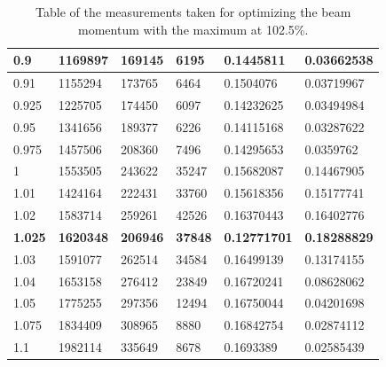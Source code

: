 \documentclass[11pt,a4paper]{article}
\begin{document}
\begin{table}[]
\begin{tabular}{|l|l|l|l|l|l|}
0.9          & 1169897     & 169145              & 6195                              & 0.1445811                             & 0.03662538                  \\ \hline
0.91         & 1155294     & 173765              & 6464                              & 0.1504076                             & 0.03719967                  \\ \hline
0.925        & 1225705     & 174450              & 6097                              & 0.14232625                            & 0.03494984                  \\ \hline
0.95         & 1341656     & 189377              & 6226                              & 0.14115168                            & 0.03287622                  \\ \hline
0.975        & 1457506     & 208360              & 7496                              & 0.14295653                            & 0.0359762                   \\ \hline
1            & 1553505     & 243622              & 35247                             & 0.15682087                            & 0.14467905                  \\ \hline
1.01         & 1424164     & 222431              & 33760                             & 0.15618356                            & 0.15177741                  \\ \hline
1.02         & 1583714     & 259261              & 42526                             & 0.16370443                            & 0.16402776                  \\ \hline
\bf{1.025}   & \bf{1620348}     & \bf{206946}              & \bf{37848}                             & \bf{0.12771701}                            & \bf{0.18288829}                  \\ \hline
1.03         & 1591077     & 262514              & 34584                             & 0.16499139                            & 0.13174155                  \\ \hline
1.04         & 1653158     & 276412              & 23849                             & 0.16720241                            & 0.08628062                  \\ \hline
1.05         & 1775255     & 297356              & 12494                             & 0.16750044                            & 0.04201698                  \\ \hline
1.075        & 1834409     & 308965              & 8880                              & 0.16842754                            & 0.02874112                  \\ \hline
1.1          & 1982114     & 335649              & 8678                              & 0.1693389                             & 0.02585439                  \\ \hline
\end{tabular}
\caption{Table of the measurements taken for optimizing the beam momentum with the maximum at 102.5\%.}
\end{table}
\end{document}
